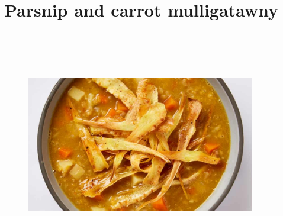 \documentclass{book}
\begin{document}
\section{Parsnip and carrot mulligatawny}
\begin{figure}
\centering\includegraphics[width=10cm,height=10cm,keepaspectratio]{Recipe_Pictures/Parsnip_and_carrot_mulligatawny.png}
\end{figure}
\end{document}
